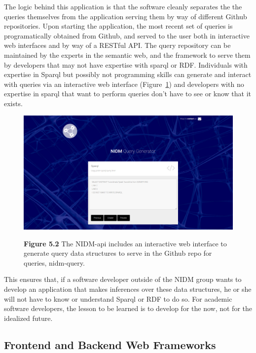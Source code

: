 \documentclass{report}
\begin{document}
The logic behind this application is that the software cleanly separates
the the queries themselves from the application serving them by way of
different Github repositories. Upon starting the application, the most
recent set of queries is programatically obtained from Github, and
served to the user both in interactive web interfaces and by way of a
RESTful API. The query repository can be maintained by the experts in
the semantic web, and the framework to serve them by developers that may
not have expertise with sparql or RDF. Individuals with expertise in
Sparql but possibly not programming skills can generate and interact
with queries via an interactive web interface (Figure~\ref{fig:52}) and
developers with no expertise in sparql that want to perform queries
don't have to see or know that it exists. ~

\begin{figure}[h!]
\begin{center}
\includegraphics[width=15cm]{images/figure52.png}
\end{center}
 \textbf{\label{fig:52} Figure 5.2 }{ The NIDM-api includes an interactive web interface to
generate query data structures to serve in the Github repo for queries,
nidm-query.}
\end{figure}

This ensures that, if a software developer outside of the NIDM group
wants to develop an application that makes inferences over these data
structures, he or she will not have to know or understand Sparql or RDF
to do so. For academic software developers, the lesson to be learned is
to develop for the now, not for the idealized future.

\subsection{Frontend and Backend Web Frameworks}
\end{document}
